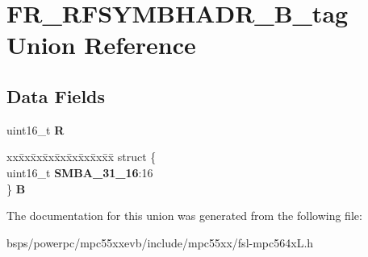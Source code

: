 \hypertarget{unionFR__RFSYMBHADR__16B__tag}{}\section{F\+R\+\_\+\+R\+F\+S\+Y\+M\+B\+H\+A\+D\+R\+\_\+B\+\_\+tag Union Reference}
\label{unionFR__RFSYMBHADR__16B__tag}
\subsection*{Data Fields}
\begin{DoxyCompactItemize}
\item 
\mbox{\label{unionFR__RFSYMBHADR__16B__tag_ae37522fe8e2cac6d5231fabbfa636519}} 
uint16\+\_\+t {\bfseries R}
\item 
\mbox{\label{unionFR__RFSYMBHADR__16B__tag_a0a15f96952990ce0c0585c58ae86f8fb}} 
\begin{tabbing}
xx\=xx\=xx\=xx\=xx\=xx\=xx\=xx\=xx\=\kill
struct \{\\
\>uint16\_t {\bfseries SMBA\_31\_16}:16\\
\} {\bfseries B}\\

\end{tabbing}\end{DoxyCompactItemize}


The documentation for this union was generated from the following file\+:\begin{DoxyCompactItemize}
\item 
bsps/powerpc/mpc55xxevb/include/mpc55xx/fsl-\/mpc564x\+L.\+h\end{DoxyCompactItemize}
